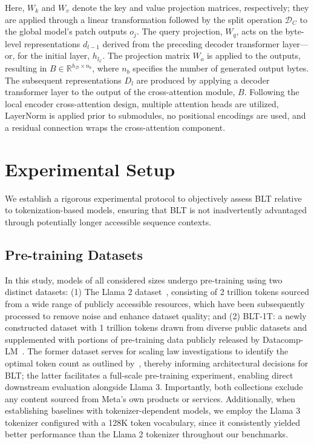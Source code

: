 Here, $W_k$ and $W_v$ denote the key and value projection matrices, respectively; they are applied through a linear transformation followed by the split operation $\mathcal{D}_C$ to the global model's patch outputs $o_j$. The query projection, $W_q$, acts on the byte-level representations $d_{l-1}$ derived from the preceding decoder transformer layer—or, for the initial layer, $h_{l_{\mathcal{E}}}$. The projection matrix $W_o$ is applied to the outputs, resulting in $B \in \mathbb{R}^{h_{\mathcal{D}} \times n_b}$, where $n_b$ specifies the number of generated output bytes. The subsequent representations $D_l$ are produced by applying a decoder transformer layer to the output of the cross-attention module, $B$. Following the local encoder cross-attention design, multiple attention heads are utilized, LayerNorm is applied prior to submodules, no positional encodings are used, and a residual connection wraps the cross-attention component.

\section{Experimental Setup}
\label{section:experiments}
We establish a rigorous experimental protocol to objectively assess {\textsc BLT} relative to tokenization-based models, ensuring that {\textsc BLT} is not inadvertently advantaged through potentially longer accessible sequence contexts.

\subsection{Pre-training Datasets} In this study, models of all considered sizes undergo pre-training using two distinct datasets: (1) The Llama 2 dataset~\citep{touvron2023llama}, consisting of 2 trillion tokens sourced from a wide range of publicly accessible resources, which have been subsequently processed to remove noise and enhance dataset quality; and (2) {\textsc BLT}-1T: a newly constructed dataset with 1 trillion tokens drawn from diverse public datasets and supplemented with portions of pre-training data publicly released by Datacomp-LM~\citep{li2024datacomp}. The former dataset serves for scaling law investigations to identify the optimal token count as outlined by~\cite{dubey2024llama}, thereby informing architectural decisions for {\textsc BLT}; the latter facilitates a full-scale pre-training experiment, enabling direct downstream evaluation alongside Llama 3. Importantly, both collections exclude any content sourced from Meta’s own products or services. Additionally, when establishing baselines with tokenizer-dependent models, we employ the Llama 3 tokenizer configured with a 128K token vocabulary, since it consistently yielded better performance than the Llama 2 tokenizer throughout our benchmarks.

